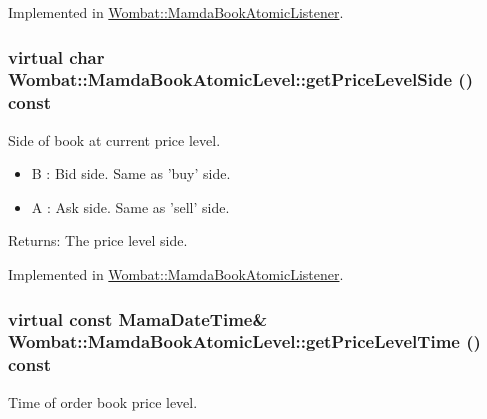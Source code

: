 Implemented in \hyperlink{classWombat_1_1MamdaBookAtomicListener_9bbc72a64bd32fba449ba581b369a980}{Wombat::Mamda\-Book\-Atomic\-Listener}.\hypertarget{classWombat_1_1MamdaBookAtomicLevel_db64c3729d50e3334a5d1eeb40aba6a4}{
\subsubsection[getPriceLevelSide]{\setlength{\rightskip}{0pt plus 5cm}virtual char Wombat::Mamda\-Book\-Atomic\-Level::get\-Price\-Level\-Side () const}}
\label{classWombat_1_1MamdaBookAtomicLevel_db64c3729d50e3334a5d1eeb40aba6a4}


Side of book at current price level. 

\begin{itemize}
\item B : Bid side. Same as 'buy' side. \item A : Ask side. Same as 'sell' side. \end{itemize}


\begin{Desc}
\item[Returns:]The price level side. \end{Desc}


Implemented in \hyperlink{classWombat_1_1MamdaBookAtomicListener_3031081549b1df511c872068f58e8ade}{Wombat::Mamda\-Book\-Atomic\-Listener}.\hypertarget{classWombat_1_1MamdaBookAtomicLevel_8eebd8c5bc48668b4f42afdcfa2e11ff}{
\subsubsection[getPriceLevelTime]{\setlength{\rightskip}{0pt plus 5cm}virtual const Mama\-Date\-Time\& Wombat::Mamda\-Book\-Atomic\-Level::get\-Price\-Level\-Time () const}}
\label{classWombat_1_1MamdaBookAtomicLevel_8eebd8c5bc48668b4f42afdcfa2e11ff}


Time of order book price level. 

